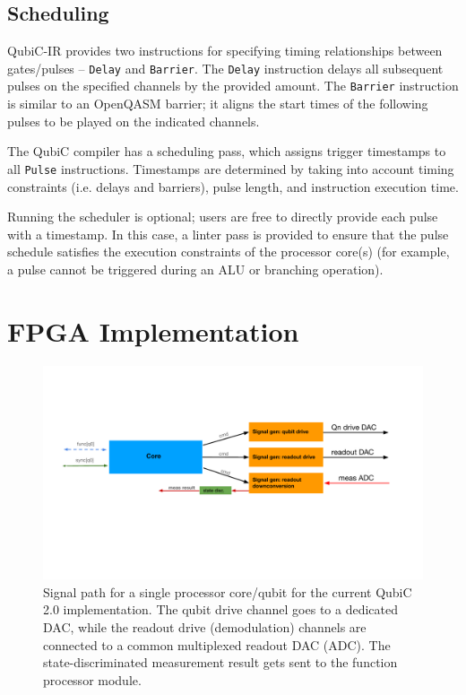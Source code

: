 \documentclass[journal]{IEEEtran}
\begin{document}
\subsection{Scheduling}

QubiC-IR provides two instructions for specifying timing relationships between gates/pulses -- \verb|Delay| and \verb|Barrier|. The \verb|Delay| instruction delays all subsequent pulses on the specified channels by the provided amount. The \verb|Barrier| instruction is similar to an OpenQASM \cite{cross2022openqasm} barrier; it aligns the start times of the following pulses to be played on the indicated channels. 

The QubiC compiler has a scheduling pass, which assigns trigger timestamps to all \verb|Pulse| instructions. Timestamps are determined by taking into account timing constraints (i.e. delays and barriers), pulse length, and instruction execution time. 

Running the scheduler is optional; users are free to directly provide each pulse with a timestamp. In this case, a linter pass is provided to ensure that the pulse schedule satisfies the execution constraints of the processor core(s) (for example, a pulse cannot be triggered during an ALU or branching operation).

\section{FPGA Implementation}

\begin{figure}
    \centering
    \includegraphics[scale=0.65, trim={30 150 30 100}, clip]{figures/core_diagram.pdf}
    \caption{Signal path for a single processor core/qubit for the current QubiC 2.0 implementation. The qubit drive channel goes to a dedicated DAC, while the readout drive (demodulation) channels are connected to a common multiplexed readout DAC (ADC). The state-discriminated measurement result gets sent to the function processor module.}
    \label{fig:single_core_diagram}
\end{figure}
\end{document}
